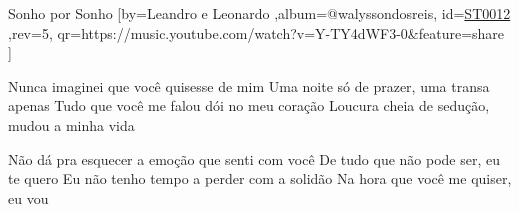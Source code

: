 \beginsong
{Sonho por Sonho %
}[by={Leandro e Leonardo %
},album={@walyssondosreis},
id={\href{https://music.youtube.com/watch?v=Y-TY4dWF3-0&feature=share %
}{ST0012 %
}},rev={5}, %
qr={https://music.youtube.com/watch?v=Y-TY4dWF3-0&feature=share %
}]

\beginverse
Nunca imaginei que você quisesse de mim
Uma noite só de prazer, uma transa apenas
Tudo que você me falou dói no meu coração
Loucura cheia de sedução, mudou a minha vida
\endverse

\beginverse
Não dá pra esquecer a emoção que senti com você
De tudo que não pode ser, eu te quero
Eu não tenho tempo a perder com a solidão
Na hora que você me quiser, eu vou
\endverse

